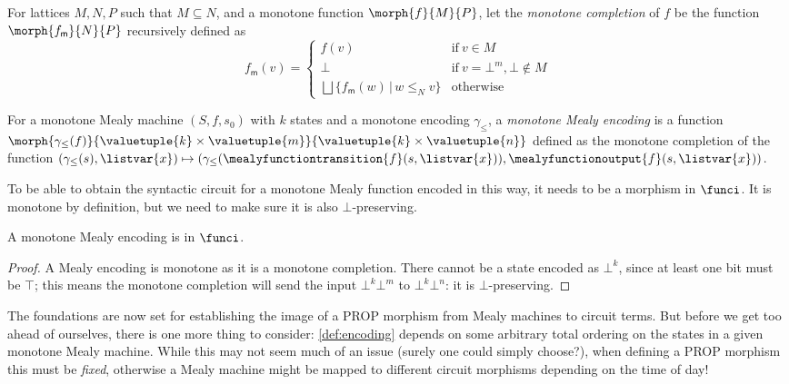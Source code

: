 \begin{definition}\label{def:monotone-completion}
    For lattices \(M, N, P\) such that \(M \subseteq N\), and a monotone
    function \(\morph{f}{M}{P}\), let the \emph{monotone completion} of \(f\) be
    the function \(\morph{f_\mathsf{m}}{N}{P}\) recursively defined as \[
        f_\mathsf{m}(v) = \begin{cases}
            f(v)
             &
            \text{if}\ v \in M
            \\
            \bot
             &
            \text{if}\ v = \bot^m, \bot \not\in M
            \\
            \bigsqcup \{ f_\mathsf{m}(w) \,|\, w \leq_N v \}
             &
            \text{otherwise}
        \end{cases}
    \]
\end{definition}

\begin{definition}\label{def:mealy-encoding}
    For a monotone Mealy machine \((S, f, s_0)\) with \(k\) states and a
    monotone encoding \(\gamma_\leq\), a \emph{monotone Mealy encoding} is a
    function
    \(
    \morph{
        \gamma_\leq(f)
    }{
        \valuetuple{k} \times \valuetuple{m}
    }{
        \valuetuple{k} \times \valuetuple{n}
    }
    \) defined as the monotone completion of the function \(
    (\gamma_\leq(s), \listvar{x})
    \mapsto
    (
    \gamma_\leq(\mealyfunctiontransition{f}(s, \listvar{x})),
    \mealyfunctionoutput{f}(s, \listvar{x})
    )
    \).
\end{definition}

To be able to obtain the syntactic circuit for a monotone Mealy function encoded
in this way, it needs to be a morphism in \(\funci\).
It is monotone by definition, but we need to make sure it is also
\(\bot\)-preserving.

\begin{lemma}
    A monotone Mealy encoding is in \(\funci\).
\end{lemma}
\begin{proof}
    A Mealy encoding is monotone as it is a monotone completion.
    There cannot be a state encoded as \(\bot^k\), since at least one bit must
    be \(\top\); this means the monotone completion will send the input
    \(\bot^k\bot^m\) to \(\bot^k\bot^n\): it is
    \(\bot\)-preserving.
\end{proof}

The foundations are now set for establishing the image of a PROP morphism from
Mealy machines to circuit terms.
But before we get too ahead of ourselves, there is one more thing to consider:
\cref{def:encoding} depends on some arbitrary total ordering on the states in a
given monotone Mealy machine.
While this may not seem much of an issue (surely one could simply choose?), when
defining a PROP morphism this must be \emph{fixed}, otherwise a Mealy machine
might be mapped to different circuit morphisms depending on the time of day!

